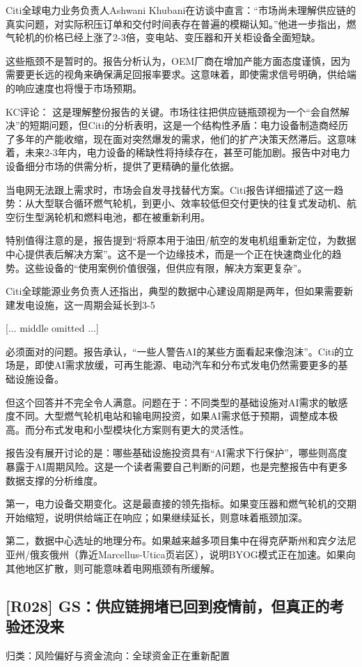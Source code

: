 \documentclass[11pt]{ctexart}
\begin{document}
Citi全球电力业务负责人Ashwani Khubani在访谈中直言：“市场尚未理解供应链的真实问题，对实际积压订单和交付时间表存在普遍的模糊认知。”他进一步指出，燃气轮机的价格已经上涨了2-3倍，变电站、变压器和开关柜设备全面短缺。

这些瓶颈不是暂时的。报告分析认为，OEM厂商在增加产能方面态度谨慎，因为需要更长远的视角来确保满足回报率要求。这意味着，即使需求信号明确，供给端的响应速度也将慢于市场预期。

KC评论： 这是理解整份报告的关键。市场往往把供应链瓶颈视为一个“会自然解决”的短期问题，但Citi的分析表明，这是一个结构性矛盾：电力设备制造商经历了多年的产能收缩，现在面对突然爆发的需求，他们的扩产决策天然滞后。这意味着，未来2-3年内，电力设备的稀缺性将持续存在，甚至可能加剧。报告中对电力设备细分市场的供需分析，提供了更精确的量化依据。

当电网无法跟上需求时，市场会自发寻找替代方案。Citi报告详细描述了这一趋势：从大型联合循环燃气轮机，到更小、效率较低但交付更快的往复式发动机、航空衍生型涡轮机和燃料电池，都在被重新利用。

特别值得注意的是，报告提到“将原本用于油田/航空的发电机组重新定位，为数据中心提供表后解决方案”。这不是一个边缘技术，而是一个正在快速商业化的趋势。这些设备的“使用案例价值很强，但供应有限，解决方案更复杂”。

Citi全球能源业务负责人还指出，典型的数据中心建设周期是两年，但如果需要新建发电设施，这一周期会延长到3-5

[... middle omitted ...]

必须面对的问题。报告承认，“一些人警告AI的某些方面看起来像泡沫”。Citi的立场是，即使AI需求放缓，可再生能源、电动汽车和分布式发电仍然需要更多的基础设施设备。

但这个回答并不完全令人满意。问题在于：不同类型的基础设施对AI需求的敏感度不同。大型燃气轮机电站和输电网投资，如果AI需求低于预期，调整成本极高。而分布式发电和小型模块化方案则有更大的灵活性。

报告没有展开讨论的是：哪些基础设施投资具有“AI需求下行保护”，哪些则高度暴露于AI周期风险。这是一个读者需要自己判断的问题，也是完整报告中有更多数据支撑的分析维度。

第一，电力设备交期变化。这是最直接的领先指标。如果变压器和燃气轮机的交期开始缩短，说明供给端正在响应；如果继续延长，则意味着瓶颈加深。

第二，数据中心选址的地理分布。如果越来越多项目集中在得克萨斯州和宾夕法尼亚州/俄亥俄州（靠近Marcellus-Utica页岩区），说明BYOG模式正在加速。如果向其他地区扩散，则可能意味着电网瓶颈有所缓解。

\subsection{[R028] GS：供应链拥堵已回到疫情前，但真正的考验还没来}
{\small\color{refgray}归类：风险偏好与资金流向：全球资金正在重新配置}
\end{document}
